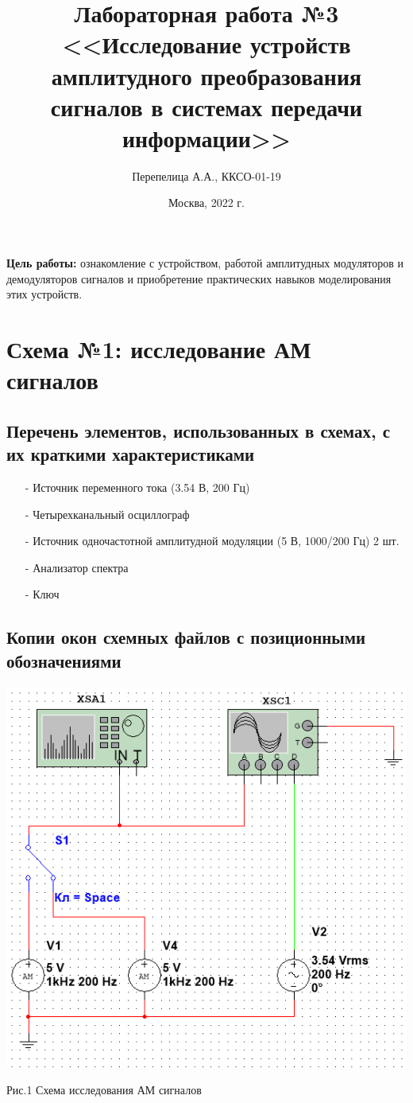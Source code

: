 \documentclass[11pt]{article}
\title{\textbf{Лабораторная работа №3\\<<Исследование устройств амплитудного преобразования сигналов в системах передачи информации>>}}
\author{Перепелица А.А., ККСО-01-19}
\date{Москва, 2022 г.}
\begin{document}
\maketitle
\thispagestyle{empty}
\textbf{Цель работы:} ознакомление с устройством, работой амплитудных 
модуляторов и демодуляторов сигналов и приобретение практических навыков 
моделирования этих устройств.

\section{Схема №1: исследование АМ сигналов}
\subsection{Перечень элементов, использованных в схемах, с
их краткими характеристиками}
\begin{itemize}
    \item[-] Источник переменного тока (3.54 В, 200 Гц)
    \item[-] Четырехканальный осциллограф
    \item[-] Источник одночастотной амплитудной модуляции (5 В, 1000/200 Гц) 2 шт.
    \item[-] Анализатор спектра 
    \item[-] Ключ
\end{itemize}


\subsection{Копии окон схемных файлов с позиционными обозначениями}
\includegraphics[width=1\linewidth]{img/first.png}
\begin{center}
    Рис.1 Схема исследования АМ сигналов
\end{center}
\end{document}
